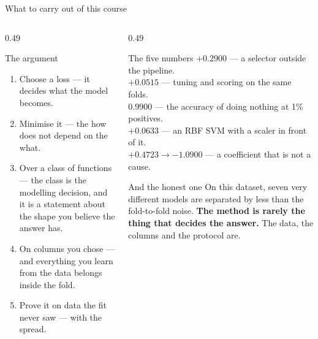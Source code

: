 \documentclass[aspectratio=169]{beamer}
\begin{document}
\begin{frame}[shrink=10]{What to carry out of this course}
  \begin{columns}[T]
    \begin{column}{0.49\textwidth}
      \begin{block}{The argument}
        \begin{enumerate}
          \item Choose a loss --- it decides what the model becomes.
          \item Minimise it --- the how does not depend on the what.
          \item Over a class of functions --- the class is the modelling
            decision, and it is a statement about the shape you believe the
            answer has.
          \item On columns you chose --- and everything you learn from the
            data belongs inside the fold.
          \item Prove it on data the fit never saw --- with the spread.
        \end{enumerate}
      \end{block}
    \end{column}
    \begin{column}{0.49\textwidth}
      \begin{alertblock}{The five numbers}
        $+0.2900$ --- a selector outside the pipeline.\\
        $+0.0515$ --- tuning and scoring on the same folds.\\
        $0.9900$ --- the accuracy of doing nothing at 1\% positives.\\
        $+0.0633$ --- an RBF SVM with a scaler in front of it.\\
        $+0.4723 \to -1.0900$ --- a coefficient that is not a cause.
      \end{alertblock}
      \begin{exampleblock}{And the honest one}
        On this dataset, seven very different models are separated by less
        than the fold-to-fold noise. \textbf{The method is rarely the thing
        that decides the answer.} The data, the columns and the protocol are.
      \end{exampleblock}
    \end{column}
  \end{columns}
\end{frame}
\end{document}
